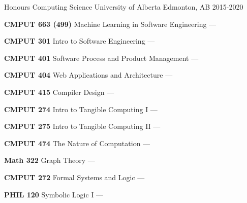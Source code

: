 
\begin{cventries}
  \cventry
    {Honours Computing Science} %
    {University of Alberta} %
    {Edmonton, AB} %
    {2015-2020} %
    {
      \begin{multicols}{2}
        \begin{cvitems} %
        \item {\textbf{CMPUT 663 (499)} Machine Learning in Software Engineering --- }
          \vspace{0.5mm}
        \item {\textbf{CMPUT 301} Intro to Software Engineering --- }
          \vspace{0.5mm}
        \item {\textbf{CMPUT 401} Software Process and Product Management --- }
          \vspace{0.5mm}
        \item {\textbf{CMPUT 404} Web Applications and Architecture --- }
          \vspace{0.5mm}
        \item {\textbf{CMPUT 415} Compiler Design --- }
          \vspace{0.5mm}
        \item {\textbf{CMPUT 274} Intro to Tangible Computing I --- }
          \vspace{0.5mm}
        \item {\textbf{CMPUT 275} Intro to Tangible Computing II --- }
          \vspace{1.5mm}
        \item {\textbf{CMPUT 474} The Nature of Computation --- }
          \vspace{0.5mm}
        \item {\textbf{Math 322} Graph Theory --- }
          \vspace{0.5mm}
        \item {\textbf{CMPUT 272} Formal Systems and Logic --- }
          \vspace{0.5mm}
        \item {\textbf{PHIL 120} Symbolic Logic I --- }

\end{cvitems}
\end{multicols}}
\end{cventries}
